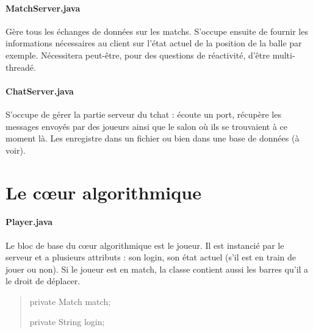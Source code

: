 \documentclass[a4paper,12pt]{report}
\begin{document}
\paragraph{MatchServer.java}
Gère tous les échanges de données sur les matchs. S'occupe ensuite de fournir les informations nécessaires au client sur l'état actuel de la position de la balle par exemple. Nécessitera peut-être, pour des questions de réactivité, d'être multi-threadé.
\paragraph{ChatServer.java}
S'occupe de gérer la partie serveur du tchat : écoute un port, récupère les messages envoyés par des joueurs ainsi que le salon où ils se trouvaient à ce moment là. Les enregistre dans un fichier ou bien dans une base de données (à voir).


\section{Le c\oe{}ur algorithmique}
\paragraph{Player.java}
Le bloc de base du c\oe{}ur algorithmique est le joueur. Il est instancié par le serveur et a plusieurs attributs : son login, son état actuel (s'il est en train de jouer ou non). Si le joueur est en match, la classe contient aussi les barres qu'il a le droit de déplacer.
\begin{quote}
	private Match match;
    
	private String login;
\end{quote}
\end{document}
